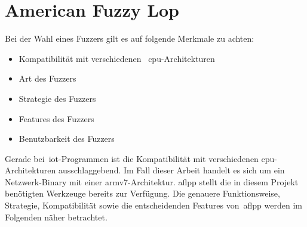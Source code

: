 
\section{American Fuzzy Lop}\label{sec:american-fuzzy-loop}
Bei der Wahl eines Fuzzers gilt es auf folgende Merkmale zu achten:
\begin{itemize}
    \item Kompatibilität mit verschiedenen ~\gls{cpu}-Architekturen
    \item Art des Fuzzers
    \item Strategie des Fuzzers
    \item Features des Fuzzers
    \item Benutzbarkeit des Fuzzers
\end{itemize}
Gerade bei~\gls{iot}-Programmen ist die Kompatibilität mit verschiedenen \gls{cpu}-Architekturen ausschlaggebend.
Im Fall dieser Arbeit handelt es sich um ein Netzwerk-Binary mit einer \gls{arm}v7-Architektur.
\gls{aflpp} stellt die in diesem Projekt benötigten Werkzeuge bereits zur Verfügung.
Die genauere Funktionsweise, Strategie, Kompatibilität sowie die entscheidenden Features von~\gls{aflpp} werden im Folgenden näher betrachtet.



